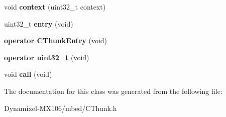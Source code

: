 \begin{DoxyCompactItemize}
\item 
void {\bfseries context} (uint32\+\_\+t context)\hypertarget{class_c_thunk_a71aee6a8caa8563244ef20708b481ca7}{}\label{class_c_thunk_a71aee6a8caa8563244ef20708b481ca7}

\item 
uint32\+\_\+t {\bfseries entry} (void)\hypertarget{class_c_thunk_ab34d8d415f55a285a226b20ff59b4f46}{}\label{class_c_thunk_ab34d8d415f55a285a226b20ff59b4f46}

\item 
{\bfseries operator C\+Thunk\+Entry} (void)\hypertarget{class_c_thunk_a7a3df7f10759ed8af0da093e9b2e1723}{}\label{class_c_thunk_a7a3df7f10759ed8af0da093e9b2e1723}

\item 
{\bfseries operator uint32\+\_\+t} (void)\hypertarget{class_c_thunk_acdcf94676900cb00a5ff753b6be957b6}{}\label{class_c_thunk_acdcf94676900cb00a5ff753b6be957b6}

\item 
void {\bfseries call} (void)\hypertarget{class_c_thunk_aaae3f0fa103eb1f515368f884252f1ad}{}\label{class_c_thunk_aaae3f0fa103eb1f515368f884252f1ad}

\end{DoxyCompactItemize}


The documentation for this class was generated from the following file\+:\begin{DoxyCompactItemize}
\item 
Dynamixel-\/\+M\+X106/mbed/C\+Thunk.\+h\end{DoxyCompactItemize}
